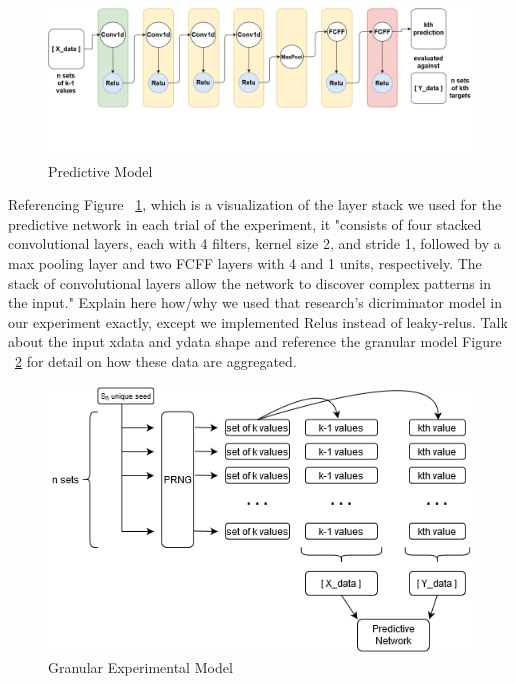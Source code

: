 \documentclass[conference]{IEEEtran}
\begin{document}
\begin{figure}[H]
\centering
\includegraphics[width=1\linewidth]{./Images/PredictiveModel.png}
\caption{Predictive Model}
\label{fig:Predictive Model}
\end{figure}

Referencing Figure ~\ref{fig:Predictive Model}, which is a visualization of the layer stack we used for the predictive network in each trial of the experiment, it "consists of four stacked convolutional layers, each with 4 filters, kernel size 2, and stride 1, followed by a max pooling layer and two FCFF layers with 4 and 1 units, respectively. The stack of convolutional layers allow the network to discover complex patterns in the input." \cite{debernardi2018pseudo} Explain here how/why we used that research's dicriminator model in our experiment exactly, except we implemented Relus instead of leaky-relus. Talk about the input xdata and ydata shape and reference the granular model Figure ~\ref{fig:Granular Experimental Model} for detail on how these data are aggregated.



\begin{figure}[H]
\centering
\includegraphics[width=1\linewidth]{./Images/GranularModel.png}
\caption{Granular Experimental Model}
\label{fig:Granular Experimental Model}
\end{figure}
\end{document}
